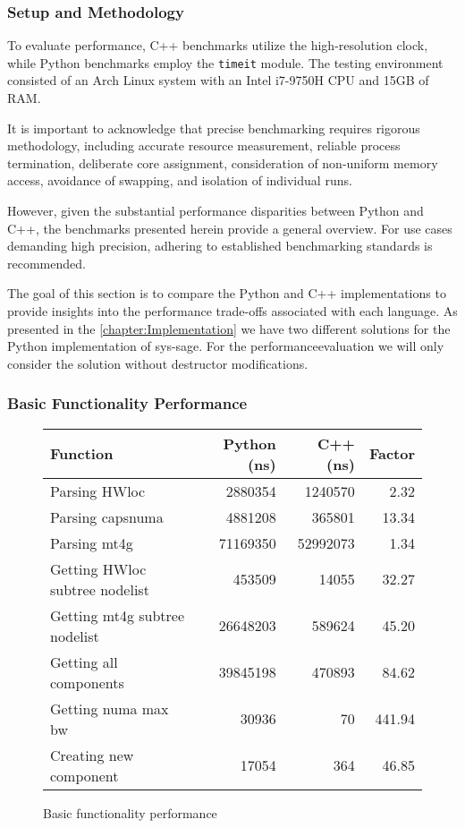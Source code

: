 \subsubsection{Setup and Methodology}

To evaluate performance, C++ benchmarks utilize the high-resolution clock, while Python benchmarks employ the \texttt{timeit} module. The testing environment consisted of an Arch Linux system with an Intel i7-9750H CPU and 15GB of RAM. \cite{python-timeit-docu}

It is important to acknowledge that precise benchmarking requires rigorous methodology, including accurate resource measurement, reliable process termination, deliberate core assignment, consideration of non-uniform memory access, avoidance of swapping, and isolation of individual runs. \cite{beyer2019reliable}

However, given the substantial performance disparities between Python and C++, the benchmarks presented herein provide a general overview. For use cases demanding high precision, adhering to established benchmarking standards is recommended.

The goal of this section is to compare the Python and C++ implementations to provide insights into the performance trade-offs associated with each language. As presented in the \autoref{chapter:Implementation} we have two different solutions for the Python implementation of sys-sage. For the performanceevaluation we will only consider the solution without destructor modifications.

\subsubsection{Basic Functionality Performance}

\begin{figure}[htpb]
    \centering
\begin{tabular}{lrrr}
\textbf{Function} & \textbf{Python (ns)} & \textbf{C++ (ns)} & \textbf{Factor} \\
\hline
Parsing HWloc & 2880354 & 1240570 & 2.32 \\
Parsing capsnuma & 4881208 & 365801 & 13.34 \\
Parsing mt4g & 71169350 & 52992073 & 1.34 \\
Getting HWloc subtree nodelist & 453509 & 14055 & 32.27 \\
Getting mt4g subtree nodelist & 26648203 & 589624 & 45.20 \\
Getting all components & 39845198 & 470893 & 84.62 \\
Getting numa max bw & 30936 & 70 & 441.94 \\
Creating new component & 17054 & 364 & 46.85 \\
\end{tabular}
\label{tab:Basic functionality performance}
\caption{Basic functionality performance}
\end{figure}

